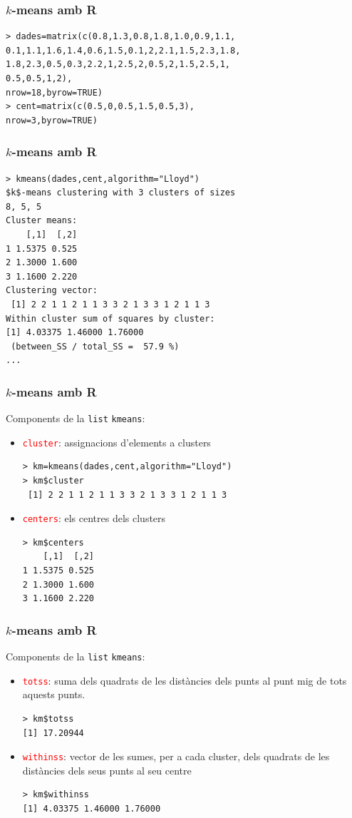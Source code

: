 \documentclass[12pt,t]{beamer}
\newcommand{\red}[1]{\textcolor{red}{#1}}
\theoremstyle{plain}
\theoremstyle{definition}
\begin{document}
\begin{frame}[fragile]
\frametitle{$k$-means amb R}

\begin{verbatim}
> dades=matrix(c(0.8,1.3,0.8,1.8,1.0,0.9,1.1,
0.1,1.1,1.6,1.4,0.6,1.5,0.1,2,2.1,1.5,2.3,1.8,
1.8,2.3,0.5,0.3,2.2,1,2.5,2,0.5,2,1.5,2.5,1,
0.5,0.5,1,2), 
nrow=18,byrow=TRUE) 
> cent=matrix(c(0.5,0,0.5,1.5,0.5,3),
nrow=3,byrow=TRUE)
\end{verbatim}


\end{frame}

\begin{frame}[fragile]
\frametitle{$k$-means amb R}

\begin{verbatim}
> kmeans(dades,cent,algorithm="Lloyd")
$k$-means clustering with 3 clusters of sizes 
8, 5, 5
Cluster means:
    [,1]  [,2]
1 1.5375 0.525
2 1.3000 1.600
3 1.1600 2.220
Clustering vector:
 [1] 2 2 1 1 2 1 1 3 3 2 1 3 3 1 2 1 1 3
Within cluster sum of squares by cluster:
[1] 4.03375 1.46000 1.76000
 (between_SS / total_SS =  57.9 %)
...
\end{verbatim}
\end{frame}


\begin{frame}[fragile]
\frametitle{$k$-means amb R}
Components de la \texttt{list} \texttt{kmeans}:

\begin{itemize}
\item \red{\texttt{cluster}}: assignacions d'elements a clusters
\begin{verbatim}
> km=kmeans(dades,cent,algorithm="Lloyd")
> km$cluster
 [1] 2 2 1 1 2 1 1 3 3 2 1 3 3 1 2 1 1 3
\end{verbatim}
\item \red{\texttt{centers}}: els centres dels clusters
\begin{verbatim}
> km$centers
    [,1]  [,2]
1 1.5375 0.525
2 1.3000 1.600
3 1.1600 2.220
\end{verbatim}
\end{itemize}
\end{frame}


\begin{frame}[fragile]
\frametitle{$k$-means amb R}
Components de la \texttt{list} \texttt{kmeans}:

\begin{itemize}
\item \red{\texttt{totss}}: suma dels quadrats de les distàncies dels punts al punt mig de tots aquests punts.
\begin{verbatim}
> km$totss  
[1] 17.20944
\end{verbatim}
\item \red{\texttt{withinss}}: vector de les sumes, per a cada cluster, dels quadrats de les distàncies dels seus punts al seu centre
\begin{verbatim}
> km$withinss
[1] 4.03375 1.46000 1.76000
\end{verbatim}
\end{itemize}
\end{frame}
\end{document}
